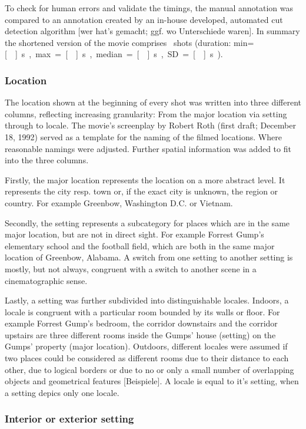 \documentclass[10pt,a4paper,twocolumn]{article}
\begin{document}
To check for human errors and validate the timings, the manual annotation was
compared to an annotation created by an in-house developed, automated cut
detection algorithm {[}wer hat's gemacht; ggf. wo Unterschiede waren{]}. In
summary the shortened version of the movie comprises \NShots\ shots (duration:
min=\unit[\ShotLengthMin]{s}, max=\unit[\ShotLengthMax]{s},
median=\unit[\ShotLengthMedian]{s}, SD=\unit[\ShotLengthSD]{s}).


\subsubsection*{Location}

The location shown at the beginning of every shot was written into
three different columns, reflecting increasing granularity: From the
major location via setting through to locale. The movie's screenplay
by Robert Roth (first draft; December 18, 1992) served as a template
for the naming of the filmed locations. Where reasonable namings were
adjusted. Further spatial information was added to fit into the three
columns.

Firstly, the major location represents the location on a more abstract
level. It represents the city resp. town or, if the exact city is
unknown, the region or country. For example Greenbow, Washington D.C.
or Vietnam. 

Secondly, the setting represents a subcategory for places which are
in the same major location, but are not in direct sight. For example
Forrest Gump's elementary school and the football field, which are
both in the same major location of Greenbow, Alabama. A switch from
one setting to another setting is mostly, but not always, congruent
with a switch to another scene in a cinematographic sense.

Lastly, a setting was further subdivided into distinguishable locales.
Indoors, a locale is congruent with a particular room bounded by its
walls or floor. For example Forrest Gump's bedroom, the corridor downstairs
and the corridor upstairs are three different rooms inside the Gumps'
house (setting) on the Gumps' property (major location). Outdoors,
different locales were assumed if two places could be considered as
different rooms due to their distance to each other, due to logical
borders or due to no or only a small number of overlapping objects
and geometrical features {[}Beispiele{]}. A locale is equal to it's
setting, when a setting depics only one locale. 


\subsubsection*{Interior or exterior setting}
\end{document}
